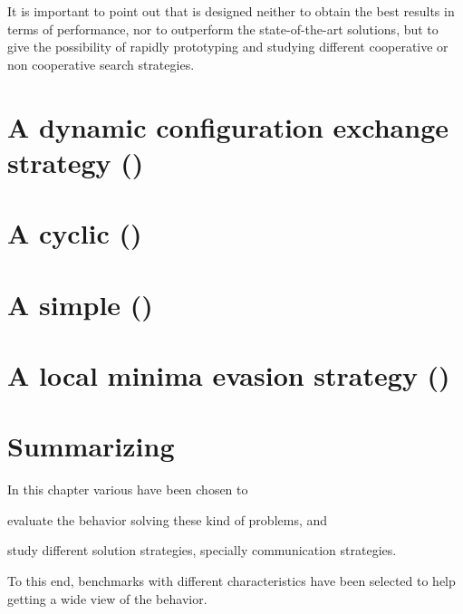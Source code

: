 It is important to point out that \posl{} is designed neither to obtain the best results in terms of performance, nor to outperform the state-of-the-art solutions, but to give the possibility of rapidly prototyping and studying different cooperative or non cooperative search strategies.


\section{A dynamic configuration exchange strategy (\sg)}


\section{A cyclic \comstr{} (\nq)}\label{sec:nqueens} %


\section{A simple \comstr{} (\carr)}\label{sec:costas} %


\section{A local minima evasion strategy (\gr)}\label{sec:golomb} %


\section{Summarizing}

In this chapter various \CSPs{} have been chosen to \begin{inparaenum}[1)] \item evaluate the \posl{} behavior solving these kind of problems, and \item study different solution strategies, specially communication strategies. \end{inparaenum} To this end, benchmarks with different characteristics have been selected to help getting a wide view of the \posl{} behavior.


